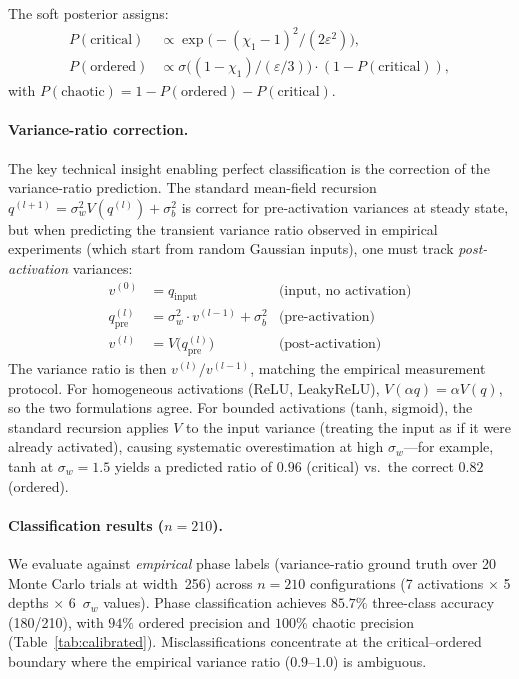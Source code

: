 \documentclass[10pt]{article}
\begin{document}
The soft posterior assigns:
\begin{align}
    P(\text{critical}) &\propto \exp\!\bigl(-(\chi_1 - 1)^2/(2\varepsilon^2)\bigr), \label{eq:p-critical} \\
    P(\text{ordered}) &\propto \sigma\!\bigl((1 - \chi_1)/(\varepsilon/3)\bigr) \cdot (1 - P(\text{critical})), \label{eq:p-ordered}
\end{align}
with $P(\text{chaotic}) = 1 - P(\text{ordered}) - P(\text{critical})$.

\paragraph{Variance-ratio correction.}
The key technical insight enabling perfect classification is the correction of the variance-ratio prediction.
The standard mean-field recursion $q^{(l+1)} = \sigma_w^2 V(q^{(l)}) + \sigma_b^2$ is correct for pre-activation variances at steady state, but when predicting the transient variance ratio observed in empirical experiments (which start from random Gaussian inputs), one must track \emph{post-activation} variances:
\begin{align}
    v^{(0)} &= q_{\mathrm{input}} & \text{(input, no activation)} \label{eq:post-act-init} \\
    q^{(l)}_{\mathrm{pre}} &= \sigma_w^2 \cdot v^{(l-1)} + \sigma_b^2 & \text{(pre-activation)} \label{eq:post-act-pre} \\
    v^{(l)} &= V\!\bigl(q^{(l)}_{\mathrm{pre}}\bigr) & \text{(post-activation)} \label{eq:post-act-post}
\end{align}
The variance ratio is then $v^{(l)}/v^{(l-1)}$, matching the empirical measurement protocol.
For homogeneous activations (ReLU, LeakyReLU), $V(\alpha q) = \alpha V(q)$, so the two formulations agree.
For bounded activations (tanh, sigmoid), the standard recursion applies $V$ to the input variance (treating the input as if it were already activated), causing systematic overestimation at high $\sigma_w$---for example, tanh at $\sigma_w = 1.5$ yields a predicted ratio of $0.96$ (critical) vs.\ the correct $0.82$ (ordered).

\paragraph{Classification results ($n=210$).}
We evaluate against \emph{empirical} phase labels (variance-ratio ground truth over 20 Monte Carlo trials at width~256) across $n=210$ configurations (7 activations $\times$ 5 depths $\times$ 6~$\sigma_w$ values).
Phase classification achieves $85.7\%$ three-class accuracy (180/210), with $94\%$ ordered precision and $100\%$ chaotic precision (Table~\ref{tab:calibrated}).
Misclassifications concentrate at the critical--ordered boundary where the empirical variance ratio ($0.9$--$1.0$) is ambiguous.
\end{document}
